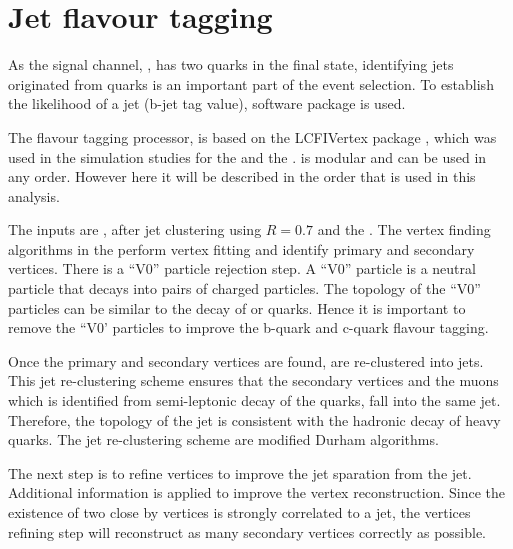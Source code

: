 \section{Jet flavour tagging}
\label{sec:doubleHiggsFlavourTagging}

As the signal channel, \eeToHHbbWWHad,  has two \Pbottom quarks in the final state, identifying jets originated from \Pbottom quarks is an important part of the event selection. To establish the likelihood of a \Pbottom jet (b-jet tag value), \lcfiplus \cite{Suehara:2015ura} software package is used.


The flavour tagging processor, \lcfiplus \cite{Suehara:2015ura} is based on the LCFIVertex package \cite{Bailey:2009ui}, which was used in the simulation studies for the \ILCloi \cite{Abe:2010aa,Aihara:2009ad} and the \CLICcdr \cite{Linssen:2012hp}.  \lcfiplus is modular and can be used in any order. However here it will be described in the order that is used in this analysis.


The inputs are \PFOs, after jet clustering using $R = 0.7$ and the \normalPFO. The vertex finding algorithms in the \lcfiplus perform vertex fitting and identify primary and secondary vertices. There is a ``V0'' particle rejection step.  A ``V0'' particle is a  neutral particle that decays into pairs of charged particles. The topology of the ``V0'' particles can be  similar to the decay of \Pbottom or \Pcharm quarks. Hence it is important to remove the ``V0' particles to improve the b-quark and c-quark flavour tagging.

Once the primary and secondary vertices are found, \PFOs are re-clustered into jets. This jet re-clustering scheme ensures that the secondary vertices and the muons which is identified from semi-leptonic decay of the quarks, fall into the same jet. Therefore, the topology of the jet is consistent with the  hadronic decay of heavy quarks. The jet re-clustering scheme are modified Durham algorithms.

The next step is to refine vertices to improve the \Pbottom jet sparation from the \Pcharm jet.  Additional information is applied to improve the vertex reconstruction. Since the existence of two close by vertices is strongly correlated to a \Pbottom jet, the vertices refining step will reconstruct as many secondary vertices correctly as possible.

